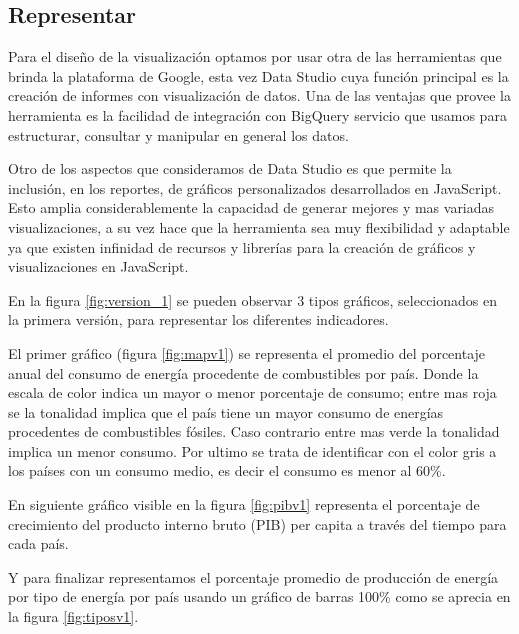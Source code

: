 \documentclass[spanish, letterpaper, 12 pt, conference]{ieeeconf}  %
\begin{document}
\subsection{Representar}

Para el diseño de la visualización optamos por usar otra de las herramientas que brinda la plataforma de Google, esta vez Data Studio cuya función principal es la creación de informes con visualización de datos. Una de las ventajas que provee la herramienta es la facilidad de integración con BigQuery servicio que usamos para estructurar, consultar y manipular en general los datos.

Otro de los aspectos que consideramos de Data Studio es que permite la inclusión, en los reportes, de gráficos personalizados desarrollados en JavaScript. Esto amplia considerablemente la capacidad de generar mejores y mas variadas visualizaciones, a su vez hace que la herramienta sea muy flexibilidad y adaptable ya que existen infinidad de recursos y librerías para la creación de gráficos y visualizaciones en JavaScript.        

En la figura \ref{fig:version_1} se pueden observar 3 tipos gráficos, seleccionados en la primera versión, para representar los diferentes indicadores.

El primer gráfico (figura \ref{fig:mapv1}) se representa el promedio del porcentaje anual del consumo de energía procedente de combustibles por país. Donde la escala de color indica un mayor o menor porcentaje de consumo; entre mas roja se la tonalidad implica que el país tiene un mayor consumo de energías procedentes de combustibles fósiles. Caso contrario entre mas verde la tonalidad implica un menor consumo. Por ultimo se trata de identificar con el color gris a los países con un consumo medio, es decir el consumo es menor al 60\%.

En siguiente gráfico visible en la figura \ref{fig:pibv1} representa el porcentaje de crecimiento del producto interno bruto (PIB) per capita a través del tiempo para cada país.

Y para finalizar representamos el porcentaje promedio de producción de energía por tipo de energía por país usando un gráfico de barras 100\% como se aprecia en la figura \ref{fig:tiposv1}.   
\end{document}
